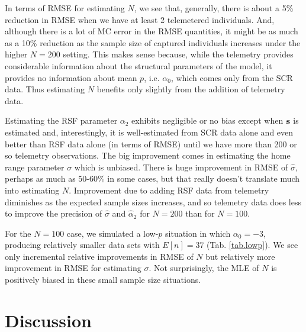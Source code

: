 \documentclass[12pt]{article}
\begin{document}

In terms of RMSE for estimating $N$, we see that, generally, there is about a 5\% reduction
in RMSE when we have at least 2 telemetered individuals. And, although 
there is a lot of MC error in the RMSE quantities, it might be as much
as a 10\% reduction as the sample size of captured individuals 
increases under the higher $N=200$ setting. This makes sense because, while
the telemetry provides considerable information about the structural
parameters of the model, it provides no information about
mean $p$, 
i.e. $\alpha_{0}$, which comes only from the SCR data. Thus 
estimating $N$  benefits only slightly from the addition of telemetry
data.


Estimating the RSF parameter $\alpha_{2}$ exhibits negligible or no
bias except when ${\bf s}$ is estimated and, interestingly, it is
well-estimated from SCR data alone and even better than RSF data alone
(in terms of RMSE) until we have more than 200 or so telemetry
observations.  The big improvement comes in estimating the home range
parameter $\sigma$ which is unbiased.
There is huge
improvement in RMSE of $\hat{\sigma}$, perhaps as much as 50-60\% in
some cases, but that really doesn't translate much into estimating
$N$.  Improvement due to adding RSF data from telemetry diminishes as
the expected sample sizes increases, and so telemetry data does less
to improve the precision of
$\hat{\sigma}$ and $\hat{\alpha}_{2}$
for $N=200$ than for $N=100$.

For the $N=100$ case, 
we simulated a low-$p$ situation  in which $\alpha_{0}=-3$, producing
relatively smaller data sets with  $E[n] = 37$
(Tab. \ref{tab.lowp}). We see 
only incremental relative improvements in RMSE of $N$ but relatively more
improvement in RMSE for estimating $\sigma$. Not surprisingly, the MLE of
$N$ is positively biased in these small sample size situations. 










\section{Discussion}
\end{document}
